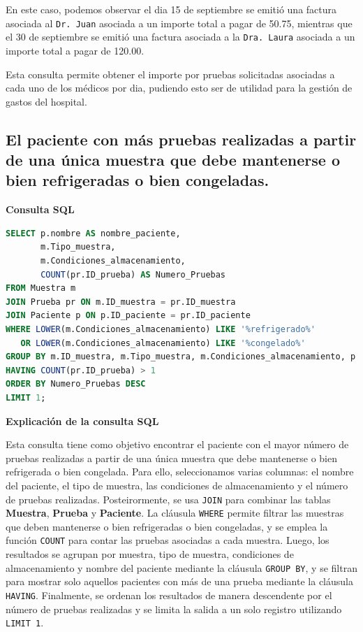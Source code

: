 \documentclass[spanish]{article}
\begin{document}
En este caso, podemos observar el dia 15 de septiembre se emitió una factura asociada al \texttt{Dr. Juan} asociada a un importe total a pagar de 50.75, mientras que el 30 de septiembre se emitió una factura asociada a la \texttt{Dra. Laura} asociada a un importe total a pagar de 120.00. 

Esta consulta permite obtener el importe por pruebas solicitadas asociadas a cada uno de los médicos por dia, pudiendo esto ser de utilidad para la gestión de gastos del hospital. 


\subsection{El paciente con más pruebas realizadas a partir de una única muestra que debe mantenerse o bien refrigeradas o bien congeladas.}

\textbf{Consulta SQL}
\begin{lstlisting}[language=SQL]
SELECT p.nombre AS nombre_paciente, 
       m.Tipo_muestra, 
       m.Condiciones_almacenamiento, 
       COUNT(pr.ID_prueba) AS Numero_Pruebas
FROM Muestra m
JOIN Prueba pr ON m.ID_muestra = pr.ID_muestra
JOIN Paciente p ON p.ID_paciente = pr.ID_paciente
WHERE LOWER(m.Condiciones_almacenamiento) LIKE '%refrigerado%' 
   OR LOWER(m.Condiciones_almacenamiento) LIKE '%congelado%'
GROUP BY m.ID_muestra, m.Tipo_muestra, m.Condiciones_almacenamiento, p.nombre
HAVING COUNT(pr.ID_prueba) > 1
ORDER BY Numero_Pruebas DESC
LIMIT 1;
\end{lstlisting}

\textbf{Explicación de la consulta SQL}

Esta consulta tiene como objetivo encontrar el paciente con el mayor número de pruebas realizadas a partir de una única muestra que debe mantenerse o bien refrigerada o bien congelada. Para ello, seleccionamos varias columnas: el nombre del paciente, el tipo de muestra, las condiciones de almacenamiento y el número de pruebas realizadas. Posteirormente, se usa \texttt{JOIN} para combinar las tablas \textbf{Muestra}, \textbf{Prueba} y \textbf{Paciente}. La cláusula \texttt{WHERE} permite filtrar las muestras que deben mantenerse o bien refrigeradas o bien congeladas, y se emplea la función \texttt{COUNT} para contar las pruebas asociadas a cada muestra. Luego, los resultados se agrupan por muestra, tipo de muestra, condiciones de almacenamiento y nombre del paciente mediante la cláusula \texttt{GROUP BY}, y se filtran para mostrar solo aquellos pacientes con más de una prueba mediante la cláusula \texttt{HAVING}. Finalmente, se ordenan los resultados de manera descendente por el número de pruebas realizadas y se limita la salida a un solo registro utilizando \texttt{LIMIT 1}.
\end{document}
